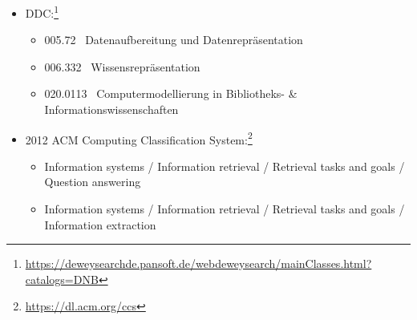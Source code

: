 \begin{itemize}
  \item 
    DDC:\footnote{\url{https://deweysearchde.pansoft.de/webdeweysearch/mainClasses.html?catalogs=DNB}}
    \begin{itemize}
      \item
        005.72~
        Datenaufbereitung und Datenrepräsentation
      \item
        006.332~
        Wissensrepräsentation
      \item
        020.0113~
        Computermodellierung in Bibliotheks- \& Informationswissenschaften
    \end{itemize}  
  \item 
    2012 ACM Computing Classification System:\footnote{\url{https://dl.acm.org/ccs}}
%    
%    
%    
    \begin{itemize}
      \item 
        Information systems / Information retrieval / Retrieval tasks and goals / Question answering
      \item 
        Information systems / Information retrieval / Retrieval tasks and goals / Information extraction
    \end{itemize}
\end{itemize}

